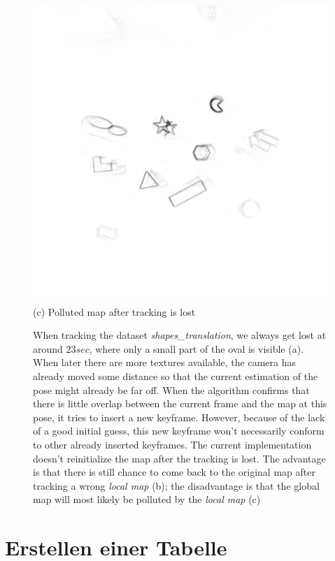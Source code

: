\begin{figure}
   \begin{minipage}[t]{0.48\textwidth}
     \centering \includegraphics[width =
     \textwidth]{images/map_956.jpg} (c) Polluted map after tracking
     is lost
   \end{minipage}
   \caption{When tracking the dataset \textit{shapes\_translation}, we
     always get lost at around $23 sec$, where only a small part of
     the oval is visible (a). When later there are more textures
     available, the camera has already moved some distance so that the
     current estimation of the pose might already be far off. When the
     algorithm confirms that there is little overlap between the
     current frame and the map at this pose, it tries to insert a new
     keyframe. However, because of the lack of a good initial guess,
     this new keyframe won't necessarily conform to other already
     inserted keyframes. The current implementation doesn't
     reinitialize the map after the tracking is lost. The advantage is
     that there is still chance to come back to the original map after
     tracking a wrong \textit{local map} (b); the disadvantage is that
     the global map will most likely be polluted by the \textit{local
       map} (c)}
   \label{fig:shapes_tr_lost}
 \end{figure}

 \section{Erstellen einer Tabelle}\label{sec:tabellen}

